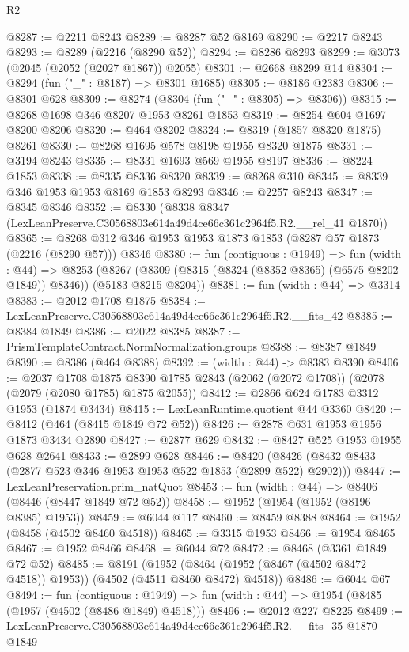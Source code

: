 \begin{lexlean}{R2}
\begin{coremodule}
@8287 := @2211 @8243
@8289 := @8287 @52 @8169
@8290 := @2217 @8243
@8293 := @8289 (@2216 (@8290 @52))
@8294 := @8286 @8293
@8299 := @3073 (@2045 (@2052 (@2027 @1867)) @2055)
@8301 := @2668 @8299 @14
@8304 := @8294 (fun ("_" : @8187) => @8301 @1685)
@8305 := @8186 @2383
@8306 := @8301 @628
@8309 := @8274 (@8304 (fun ("_" : @8305) => @8306))
@8315 := @8268 @1698 @346 @8207 @1953 @8261 @1853
@8319 := @8254 @604 @1697 @8200 @8206
@8320 := @464 @8202
@8324 := @8319 (@1857 @8320 @1875) @8261
@8330 := @8268 @1695 @578 @8198 @1955 @8320 @1875
@8331 := @3194 @8243
@8335 := @8331 @1693 @569 @1955 @8197
@8336 := @8224 @1853
@8338 := @8335 @8336 @8320
@8339 := @8268 @310
@8345 := @8339 @346 @1953 @1953 @8169 @1853 @8293
@8346 := @2257 @8243
@8347 := @8345 @8346
@8352 := @8330 (@8338 @8347 (LexLeanPreserve.C30568803e614a49d4ce66c361c2964f5.R2.__rel_41 @1870))
@8365 := @8268 @312 @346 @1953 @1953 @1873 @1853 (@8287 @57 @1873 (@2216 (@8290 @57))) @8346
@8380 := fun (contiguous : @1949) =>
  fun (width : @44) =>
  @8253 (@8267 (@8309 (@8315 (@8324 (@8352 @8365) (@6575 @8202 @1849)) @8346)) (@5183 @8215 @8204))
@8381 := fun (width : @44) => @3314
@8383 := @2012 @1708 @1875
@8384 := LexLeanPreserve.C30568803e614a49d4ce66c361c2964f5.R2.__fits_42
@8385 := @8384 @1849
@8386 := @2022 @8385
@8387 := PrismTemplateContract.NormNormalization.groups
@8388 := @8387 @1849
@8390 := @8386 (@464 @8388)
@8392 := (width : @44) -> @8383 @8390
@8406 := @2037
    @1708
    @1875
    @8390
    @1785
    @2843
    (@2062 (@2072 @1708))
    (@2078 (@2079 (@2080 @1785) @1875 @2055))
@8412 := @2866 @624 @1783 @3312 @1953 (@1874 @3434)
@8415 := LexLeanRuntime.quotient @44 @3360
@8420 := @8412 (@464 (@8415 @1849 @72 @52))
@8426 := @2878 @631 @1953 @1956 @1873 @3434 @2890
@8427 := @2877 @629
@8432 := @8427 @525 @1953 @1955 @628 @2641
@8433 := @2899 @628
@8446 := @8420 (@8426 (@8432 @8433 (@2877 @523 @346 @1953 @1953 @522 @1853 (@2899 @522) @2902)))
@8447 := LexLeanPreservation.prim_natQuot
@8453 := fun (width : @44) => @8406 (@8446 (@8447 @1849 @72 @52))
@8458 := @1952 (@1954 (@1952 (@8196 @8385) @1953))
@8459 := @6044 @117
@8460 := @8459 @8388
@8464 := @1952 (@8458 (@4502 @8460 @4518))
@8465 := @3315 @1953
@8466 := @1954 @8465
@8467 := @1952 @8466
@8468 := @6044 @72
@8472 := @8468 (@3361 @1849 @72 @52)
@8485 := @8191
    (@1952 (@8464 (@1952 (@8467 (@4502 @8472 @4518)) @1953)) (@4502 (@4511 @8460 @8472) @4518))
@8486 := @6044 @67
@8494 := fun (contiguous : @1949) =>
  fun (width : @44) => @1954 (@8485 (@1957 (@4502 (@8486 @1849) @4518)))
@8496 := @2012 @227 @8225
@8499 := LexLeanPreserve.C30568803e614a49d4ce66c361c2964f5.R2.__fits_35 @1870 @1849

\end{coremodule}
\end{lexlean}
